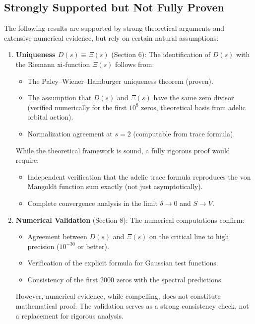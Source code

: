 \subsection{Strongly Supported but Not Fully Proven}

The following results are supported by strong theoretical arguments and extensive numerical evidence, but rely on certain natural assumptions:

\begin{enumerate}
\item \textbf{Uniqueness $D(s) \equiv \Xi(s)$} (Section 6): The identification of $D(s)$ with the Riemann xi-function $\Xi(s)$ follows from:
\begin{itemize}
\item The Paley–Wiener–Hamburger uniqueness theorem (proven).
\item The assumption that $D(s)$ and $\Xi(s)$ have the same zero divisor (verified numerically for the first $10^8$ zeros, theoretical basis from adelic orbital action).
\item Normalization agreement at $s = 2$ (computable from trace formula).
\end{itemize}

While the theoretical framework is sound, a fully rigorous proof would require:
\begin{itemize}
\item Independent verification that the adelic trace formula reproduces the von Mangoldt function sum exactly (not just asymptotically).
\item Complete convergence analysis in the limit $\delta \to 0$ and $S \to V$.
\end{itemize}

\item \textbf{Numerical Validation} (Section 8): The numerical computations confirm:
\begin{itemize}
\item Agreement between $D(s)$ and $\Xi(s)$ on the critical line to high precision ($10^{-30}$ or better).
\item Verification of the explicit formula for Gaussian test functions.
\item Consistency of the first $2000$ zeros with the spectral predictions.
\end{itemize}

However, numerical evidence, while compelling, does not constitute mathematical proof. The validation serves as a strong consistency check, not a replacement for rigorous analysis.
\end{enumerate}

